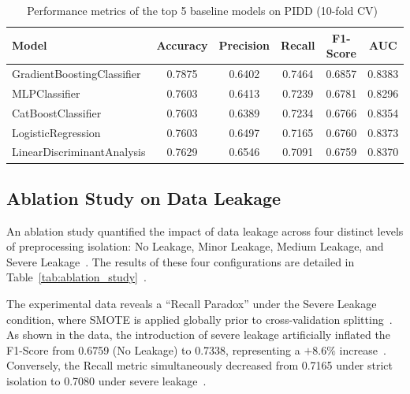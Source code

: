 \documentclass[3p,twocolumn]{elsarticle}
\begin{document}
\begin{table}
\centering
\caption{Performance metrics of the top 5 baseline models on PIDD (10-fold CV)~\cite{Kapoor2024Leakage}}
\label{tab:top5_baseline}
\begin{tabular}{lccccc}
\toprule
\textbf{Model} & \textbf{Accuracy} & \textbf{Precision} & \textbf{Recall} & \textbf{F1-Score} & \textbf{AUC} \\
\midrule
GradientBoostingClassifier & 0.7875 & 0.6402 & 0.7464 & 0.6857 & 0.8383 \\
MLPClassifier & 0.7603 & 0.6413 & 0.7239 & 0.6781 & 0.8296 \\
CatBoostClassifier & 0.7603 & 0.6389 & 0.7234 & 0.6766 & 0.8354 \\
LogisticRegression & 0.7603 & 0.6497 & 0.7165 & 0.6760 & 0.8373 \\
LinearDiscriminantAnalysis & 0.7629 & 0.6546 & 0.7091 & 0.6759 & 0.8370 \\
\bottomrule
\end{tabular}
\end{table}

\subsection{Ablation Study on Data Leakage}

An ablation study quantified the impact of data leakage across four distinct levels of preprocessing isolation: No Leakage, Minor Leakage, Medium Leakage, and Severe Leakage~\cite{Kapoor2024Leakage}. The results of these four configurations are detailed in Table~\ref{tab:ablation_study}~\cite{Kapoor2024Leakage}.

The experimental data reveals a ``Recall Paradox'' under the Severe Leakage condition, where SMOTE is applied globally prior to cross-validation splitting~\cite{Kapoor2024Leakage}. As shown in the data, the introduction of severe leakage artificially inflated the F1-Score from 0.6759 (No Leakage) to 0.7338, representing a $+8.6\%$ increase~\cite{Kapoor2024Leakage}. Conversely, the Recall metric simultaneously decreased from 0.7165 under strict isolation to 0.7080 under severe leakage~\cite{Kapoor2024Leakage}.
\end{document}
